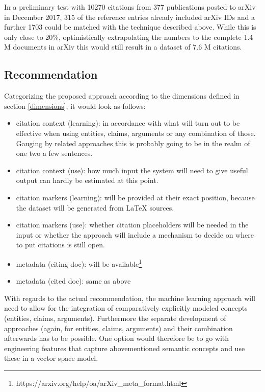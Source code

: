 \documentclass{proseminar}
\begin{document}
In a preliminary test with 10270 citations from 377 publications posted to arXiv in December 2017, 315 of the reference entries already included arXiv IDs and a further 1703 could be matched with the technique described above. While this is only close to 20\%, optimistically extrapolating the numbers to the complete 1.4 M documents in arXiv this would still result in a dataset of 7.6 M citations.

\subsection{Recommendation}
Categorizing the proposed approach according to the dimensions defined in section \ref{dimensions}, it would look as follows:

\begin{itemize}
    \item citation context (learning): in accordance with what will turn out to be effective when using entities, claims, arguments or any combination of those. Gauging by related approaches this is probably going to be in the realm of one two a few sentences.
    \item citation context (use): how much input the system will need to give useful output can hardly be estimated at this point.
    \item citation markers (learning): will be provided at their exact position, because the dataset will be generated from LaTeX sources.
    \item citation markers (use): whether citation placeholders will be needed in the input or whether the approach will include a mechanism to decide on where to put citations is still open.
    \item metadata (citing doc): will be available\footnote{https://arxiv.org/help/oa/arXiv\_meta\_format.html}
    \item metadata (cited doc): same as above
\end{itemize}

With regards to the actual recommendation, the machine learning approach will need to allow for the integration of comparatively explicitly modeled concepts (entities, claims, arguments). Furthermore the separate development of approaches (again, for entities, claims, arguments) and their combination afterwards has to be possible. One option would therefore be to go with engineering features that capture abovementioned semantic concepts and use these in a vector space model.
\end{document}
